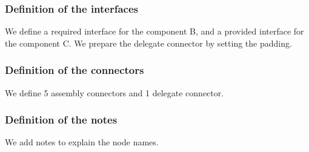 \documentclass[a4paper,11pt]{report}
\newcommand{\inputTikZ}[1]{%
  }%
\newcommand{\inputTikZ}[1]{%
    \texttt{[image: fig/\#1.pdf]}%
  }%
\begin{document}


\begin{center}
\inputTikZ{compdiagexstep1}
\end{center}

\subsubsection{Definition of the interfaces}

We define a required interface for the component B, and a provided interface for the component C. We prepare the delegate connector by setting the padding.

\medskip

\vspace{-0.4cm}
{\color{red!70!black} \vspace{-0.4cm}}


\begin{center}
\inputTikZ{compdiagexstep2}
\end{center}

\subsubsection{Definition of the connectors}

We define 5 assembly connectors and 1 delegate connector.

\medskip

\vspace{-0.4cm}
{\color{red!70!black}}

\begin{center}
\inputTikZ{compdiagexstep3}
\end{center}

\subsubsection{Definition of the notes}

We add notes to explain the node names.

\medskip

\vspace{-0.4cm}
{\color{red!70!black}}

\begin{center}
\inputTikZ{compdiagexstep4}
\end{center}

\end{document}
